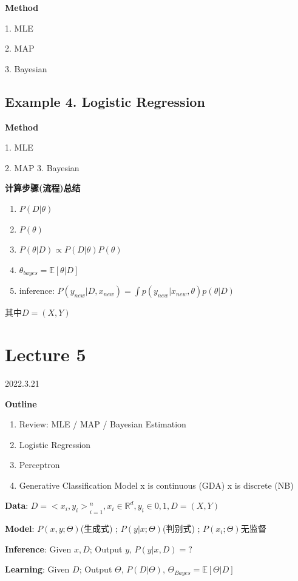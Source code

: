 \documentclass[UTF8]{ctexart}
\begin{document}
\textbf{Method}

1. MLE 

2. MAP

3. Bayesian

\subsection{Example 4. Logistic Regression}

\textbf{Method}

1. MLE 

2. MAP
3. Bayesian

\textbf{计算步骤(流程)总结}

\begin{enumerate}
    \item $P(D|\theta)$
    \item $P(\theta)$
    \item $P(\theta|D) \propto P(D | \theta)P(\theta)$
    \item $\theta_{bayes} = \mathbb{E}[\theta | D]$
    \item inference: $P(y_{new}|D,x_{new})=\int p(y_{new}|x_{new}, \theta)p(\theta | D)$
\end{enumerate}
其中$D = (X,Y)$


\newpage

\section{Lecture 5}
2022.3.21


\textbf{Outline}
\begin{enumerate}
    \item Review: MLE / MAP / Bayesian Estimation
    \item Logistic Regression
    \item Perceptron
    \item Generative Classification Model
        \subitem x is continuous (GDA)
        \subitem x is discrete (NB)
\end{enumerate}

\dotfill

\textbf{Data}: $D={<x_i, y_i>}_{i=1}^n, x_i \in \mathbb{R}^d, y_i\in{0,1}, D=(X,Y)$ 

\textbf{Model}: $P(x,y; \Theta)$(生成式) ; $P(y|x; \Theta)$(判别式) ; $P(x_i; \Theta)$无监督

\textbf{Inference}: Given $x, D$; Output $y$, $P(y|x, D)=?$

\textbf{Learning}: Given $D$; Output $\Theta$, $P(D|\Theta)$, $\Theta_{Bayes}=\mathbb{E}[\Theta|D]$
\end{document}
